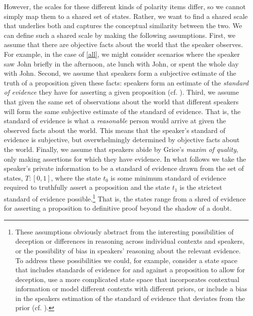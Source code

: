 \documentclass[linguex]{sp}
\theoremstyle{definition} \newtheorem{definition}{Definition}
\begin{document}
However, the scales for these different kinds of polarity items differ, so we cannot simply map them to a shared set of states. Rather, we want to find a shared scale that underlies both and captures the conceptual similarity between the two. We can define such a shared scale by making the following assumptions. First, we assume that there are objective facts about the world that the speaker observes. For example, in the case of \ref{all}, we might consider scenarios where the speaker saw John briefly in the afternoon, ate lunch with John, or spent the whole day with John. Second, we assume that speakers form a subjective estimate of the truth of a proposition given these facts: speakers form an estimate of the \emph{standard of evidence} they have for asserting a given proposition (cf. \citealt{lewis1970,krifka1995polarity}). Third, we assume that given the same set of observations about the world that different speakers will form the same subjective estimate of the standard of evidence. That is,  the standard of evidence is what a \emph{reasonable} person would arrive at given the observed facts about the world. This means that the speaker's standard of evidence is subjective, but overwhelmingly determined by objective facts about the world. Finally, we assume that speakers abide by Grice's \citeyearpar{grice1975} \emph{maxim of quality}, only making assertions for which they have evidence.  In what follows we take the speaker's private information to be a standard of evidence drawn from the set of states, $T : [0,1]$, where the state  $t_0$ is some minimum standard of evidence required to truthfully assert a proposition and the state  $t_1$ is the strictest standard of evidence possible.\footnote{These assumptions obviously abstract from the interesting possibilities of deception or differences in reasoning across individual contexts and speakers, or the possibility of bias in speakers' reasoning about the relevant evidence. To address these possibilities we could, for example, consider a state space that includes standards of evidence for and against a proposition to allow for deception, use a more complicated state space that incorporates contextual information or model different contexts with different priors, or include a bias in the speakers estimation of the standard of evidence that deviates from the prior  (cf. \citealt{schaden2012}).} That is, the states range from a shred of evidence for asserting a proposition to definitive proof beyond the shadow of a doubt.
\end{document}
